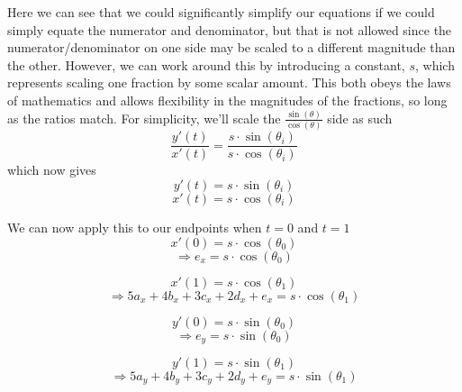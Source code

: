 \documentclass[12pt, letterpaper]{article}
\begin{document}
Here we can see that we could significantly simplify our equations if we could simply equate the numerator and denominator, but that is not allowed since the numerator/denominator on one side may be scaled to a different magnitude than the other. However, we can work around this by introducing a constant, $s$, which represents scaling one fraction by some scalar amount. This both obeys the laws of mathematics and allows flexibility in the magnitudes of the fractions, so long as the ratios match. For simplicity, we'll scale the $\frac{\sin(\theta)}{\cos(\theta)}$ side as such
\[\frac{y'(t)}{x'(t)} = \frac{s \cdot \sin(\theta_i)}{s \cdot \cos(\theta_i)}\]
which now gives 
\[y'(t) = s \cdot \sin(\theta_i)\]
\[x'(t) = s \cdot \cos(\theta_i)\]

\newpage
We can now apply this to our endpoints when $t = 0$ and $t = 1$ 
 \[x'(0) = s \cdot \cos(\theta_0)\]
\begin{equation}
\boxed{\Rightarrow e_x = s \cdot \cos(\theta_0)}
\end{equation} 

\[x'(1) = s \cdot \cos(\theta_1)\]
\[\Rightarrow 5a_x + 4b_x + 3c_x + 2d_x + e_x = s \cdot \cos(\theta_1)\]

\[y'(0) = s \cdot \sin(\theta_0)\]
\begin{equation}
\boxed{\Rightarrow e_y = s \cdot \sin(\theta_0)}
\end{equation} 

\[y'(1) = s \cdot \sin(\theta_1)\]
\[\Rightarrow 5a_y + 4b_y + 3c_y + 2d_y + e_y = s \cdot \sin(\theta_1)\]
\end{document}
